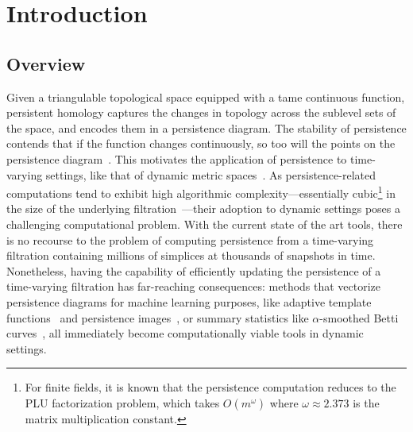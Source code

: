 \documentclass{siamart190516}
\begin{document}
\section{Introduction} 
\subsection{Overview}\label{sec:overview} 
Given a triangulable topological space equipped with a  tame continuous function, persistent homology captures the changes in topology across the sublevel sets of the space, and encodes them in a persistence diagram. The stability of persistence contends that   if the function changes continuously, so too will the points on the persistence diagram~\cite{cohen2007stability, cohen2006vines}. 
This motivates the  application of persistence to time-varying  settings, like that of dynamic metric spaces~\cite{kim2020spatiotemporal}. 
As persistence-related computations tend to exhibit high algorithmic complexity---essentially cubic\footnote{For finite fields, it is known that the persistence computation reduces to the PLU factorization problem, which takes $O(m^\omega)$ where $\omega \approx 2.373$ is the matrix multiplication constant.} in the size of the underlying filtration~\cite{morozov2005persistence}---their adoption to dynamic settings poses a challenging computational problem.
With the current state of the art tools, there is no recourse to the problem of computing persistence from a time-varying filtration containing millions of simplices at thousands of snapshots in time.
Nonetheless, having the capability of efficiently updating the persistence of a time-varying filtration has far-reaching consequences: methods that vectorize persistence diagrams for machine learning purposes, like adaptive template functions~\cite{polanco2019adaptive} and persistence images~\cite{adams2017persistence}, or summary statistics like $\alpha$-smoothed Betti curves~\cite{ulmer2019topological}, all immediately become computationally viable tools in dynamic settings. 
  
\end{document}

